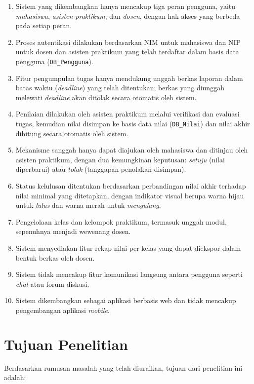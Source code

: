 \documentclass[12pt,a4paper,twoside]{report}
\begin{document}
\begin{enumerate}
    \item Sistem yang dikembangkan hanya mencakup tiga peran pengguna, yaitu \textit{mahasiswa}, \textit{asisten praktikum}, dan \textit{dosen}, dengan hak akses yang berbeda pada setiap peran.
    \item Proses autentikasi dilakukan berdasarkan NIM untuk mahasiswa dan NIP untuk dosen dan asisten praktikum yang telah terdaftar dalam basis data pengguna (\texttt{DB\_Pengguna}).
    \item Fitur pengumpulan tugas hanya mendukung unggah berkas laporan dalam batas waktu (\textit{deadline}) yang telah ditentukan; berkas yang diunggah melewati \textit{deadline} akan ditolak secara otomatis oleh sistem.
    \item Penilaian dilakukan oleh asisten praktikum melalui verifikasi dan evaluasi tugas, kemudian nilai disimpan ke basis data nilai (\texttt{DB\_Nilai}) dan nilai akhir dihitung secara otomatis oleh sistem.
    \item Mekanisme sanggah hanya dapat diajukan oleh mahasiswa dan ditinjau oleh asisten praktikum, dengan dua kemungkinan keputusan: \textit{setuju} (nilai diperbarui) atau \textit{tolak} (tanggapan penolakan disimpan).
    \item Status kelulusan ditentukan berdasarkan perbandingan nilai akhir terhadap nilai minimal yang ditetapkan, dengan indikator visual berupa warna hijau untuk \textit{lulus} dan warna merah untuk \textit{mengulang}.
    \item Pengelolaan kelas dan kelompok praktikum, termasuk unggah modul, sepenuhnya menjadi wewenang dosen.
    \item Sistem menyediakan fitur rekap nilai per kelas yang dapat diekspor dalam bentuk berkas oleh dosen.
    \item Sistem tidak mencakup fitur komunikasi langsung antara pengguna seperti \textit{chat} atau forum diskusi.
    \item Sistem dikembangkan sebagai aplikasi berbasis web dan tidak mencakup pengembangan aplikasi \textit{mobile}.
\end{enumerate}

\section{Tujuan Penelitian}

Berdasarkan rumusan masalah yang telah diuraikan, tujuan dari penelitian ini adalah:
\end{document}
